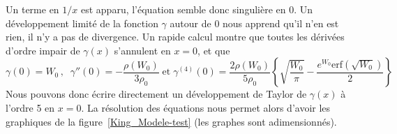 	Un terme en $1/x$ est apparu, l'équation semble donc singulière en $0$. Un 
	développement limité de la fonction $\gamma$ autour de $0$ nous apprend qu'il n'en est rien, il n'y a
	pas de divergence. Un rapide calcul montre que toutes les dérivées d'ordre impair de $\gamma(x)$ s'annulent en $x=0$, et que 
	$$
	\gamma(0) = W_0\, ,\;\; \gamma''(0) = -\frac{\rho(W_0)}{3\rho_0}\; \mathrm{et}\; \gamma^{(4)}(0) = \frac{2\rho(W_0)}{5\rho_0}\left\{\sqrt{\frac{W_0}{\pi}} -
			\frac{e^{W_0}\mathrm{erf}(\sqrt{W_0})}{2}\right\} 
	$$
	Nous pouvons donc écrire directement un développement de Taylor de $\gamma(x)$ à l'ordre 5 en $x=0$. 
	La résolution des équations nous permet alors d'avoir les graphiques de la
	figure~\ref{King_Modele-test} (les graphes sont adimensionnés).%


